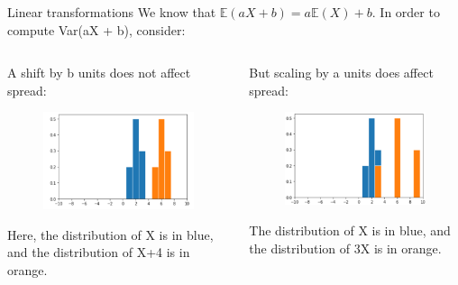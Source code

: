 \documentclass[aspectratio=169]{../latex_main/tntbeamer}  %
\begin{document}
	
	\begin{frame}[c]{Linear transformations}
	    We know that  $\mathbb{E}(aX + b) = a\mathbb{E}(X) + b$. In order to compute Var(aX + b), consider:\\
	    \begin{columns}
	        \begin{column}{.4\textwidth}
	                A shift by b units does not affect spread:
	                \begin{figure}
	                    \includegraphics[scale=.5]{Bild7}
	                \end{figure}
	                Here, the distribution of X is in blue, and the distribution of X+4 is in orange.
	        \end{column}
	        
	        
	        \begin{column}{.4\textwidth}
	                But scaling by a units does affect spread:
	                \begin{figure}
	                    \includegraphics[scale=.35]{Bild8}
	                \end{figure}
	                The distribution of X is in blue, and the distribution of 3X is in orange. 
	        \end{column}
	    \end{columns}
	\end{frame}
	
\end{document}
